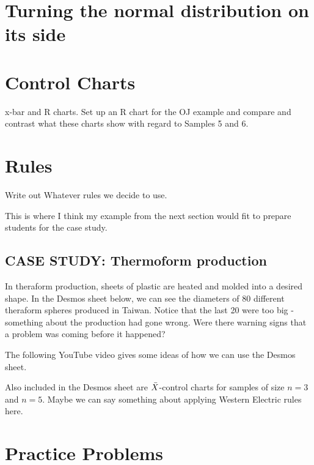 \documentclass{ximera}
\begin{document}
\section*{Turning the normal distribution on its side}

\begin{onlineOnly}
\begin{center}
\end{center}
\end{onlineOnly}

\section*{Control Charts}

x-bar and R charts.  Set up an R chart for the OJ example and compare and contrast what these charts show with regard to Samples 5 and 6.

\section*{Rules}
Write out Whatever rules we decide to use.  

This is where I think my example from the next section would fit to prepare students for the case study.

\subsection*{CASE STUDY: Thermoform production}

In theraform production, sheets of plastic are heated and molded into a desired shape.  In the Desmos sheet below, we can see the diameters of 80 different theraform spheres produced in Taiwan.  Notice that the last 20 were too big - something about the production had gone wrong.  Were there warning signs that a problem was coming before it happened?


The following YouTube video gives some ideas of how we can use the Desmos sheet.


Also included in the Desmos sheet are $\Bar{X}$-control charts for samples of size $n=3$ and $n=5$.  Maybe we can say something about applying Western Electric rules here.

\section*{Practice Problems}
\end{document}
